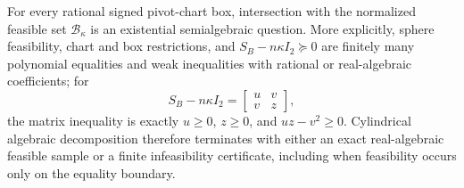 For every rational signed pivot-chart box, intersection with the normalized feasible set \(\mathcal B_\kappa\) is an existential semialgebraic question.  More explicitly, sphere feasibility, chart and box restrictions, and \(S_B-n\kappa I_2\succeq0\) are finitely many polynomial equalities and weak inequalities with rational or real-algebraic coefficients; for
\[
 S_B-n\kappa I_2=\begin{bmatrix}u&v\\v&z\end{bmatrix},
\]
the matrix inequality is exactly \(u\ge0\), \(z\ge0\), and \(uz-v^2\ge0\).  Cylindrical algebraic decomposition therefore terminates with either an exact real-algebraic feasible sample or a finite infeasibility certificate, including when feasibility occurs only on the equality boundary.